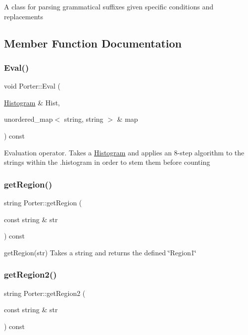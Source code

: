 A class for parsing grammatical suffixes given specific conditions and replacements 

\subsection{Member Function Documentation}
\mbox{\label{classPorter_afbe6ae10a924a4419e62a20babe3be7d}} 
\subsubsection{\texorpdfstring{Eval()}{Eval()}}
{\footnotesize\ttfamily void Porter\+::\+Eval (\begin{DoxyParamCaption}\item[{\hyperlink{classHistogram}{Histogram} \&}]{Hist,  }\item[{unordered\+\_\+map$<$ string, string $>$ \&}]{map }\end{DoxyParamCaption}) const}

Evaluation operator. Takes a \hyperlink{classHistogram}{Histogram} and applies an 8-\/step algorithm to the strings within the .histogram in order to stem them before counting \mbox{\label{classPorter_a9e33d06b477f04db7c8cee07e85e8bcb}} 
\subsubsection{\texorpdfstring{get\+Region()}{getRegion()}}
{\footnotesize\ttfamily string Porter\+::get\+Region (\begin{DoxyParamCaption}\item[{const string \&}]{str }\end{DoxyParamCaption}) const}

get\+Region(str) Takes a string and returns the defined \char`\"{}\+Region1\char`\"{} \mbox{\label{classPorter_a1420c413bb564a22e4fc0c6627e1870b}} 
\subsubsection{\texorpdfstring{get\+Region2()}{getRegion2()}}
{\footnotesize\ttfamily string Porter\+::get\+Region2 (\begin{DoxyParamCaption}\item[{const string \&}]{str }\end{DoxyParamCaption}) const}

